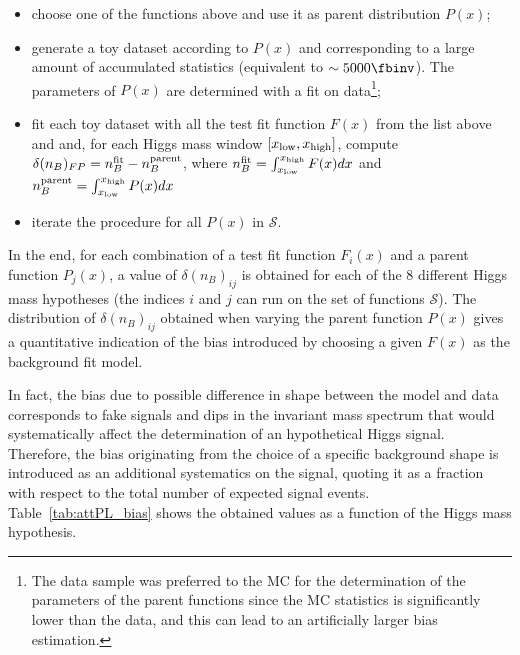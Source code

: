 \begin{itemize}
\item choose one of the functions above and use it as parent distribution $P(x)$;
\item generate a toy dataset according to $P(x)$ and corresponding to a large amount of accumulated
statistics (equivalent to $\sim 5000\fbinv$). The parameters of $P(x)$ are determined with a fit on
data\footnote{The data sample was preferred to the MC for the determination of the parameters of
the parent functions since the MC statistics is significantly lower than the data, and this can lead
to an artificially larger bias estimation.};
\item fit each toy dataset with all the test fit function $F(x)$ from the list above and and, for
each Higgs mass window $[x_{\textnormal{low}},x_{\textnormal{high}}]$, compute
$\delta(n_B)_{FP} = n_B^{\textnormal{fit}} - n_B^{\textnormal{parent}}$, where
$n_B^{\textnormal{fit}} = \int_{x_{\textnormal{low}}}^{x_{\textnormal{high}}} F(x) dx$ and
$n_B^{\textnormal{parent}} = \int_{x_{\textnormal{low}}}^{x_{\textnormal{high}}} P(x) dx$
\item iterate the procedure for all $P(x)$ in $\mathcal{S}$.
\end{itemize}
In the end, for each combination of a test fit function $F_i(x)$ and a parent function $P_j(x)$,
a value of $\delta(n_B)_{ij}$ is obtained for each of the 8 different Higgs mass hypotheses (the
indices $i$ and $j$ can run on the set of functions $\mathcal{S}$). The distribution of
$\delta(n_B)_{ij}$ obtained when varying the parent function $P(x)$ gives a quantitative
indication of the bias introduced by choosing a given $F(x)$ as the background fit model.

In fact, the bias due to possible difference in shape between the model and data corresponds to
fake signals and dips in the invariant mass spectrum that would systematically affect the
determination of an hypothetical Higgs signal. Therefore, the bias originating from the choice of a
specific background shape is introduced as an additional systematics on the signal, quoting it as a
fraction with respect to the total number of expected signal events. Table~\ref{tab:attPL_bias}
shows the obtained values as a function of the Higgs mass hypothesis.

